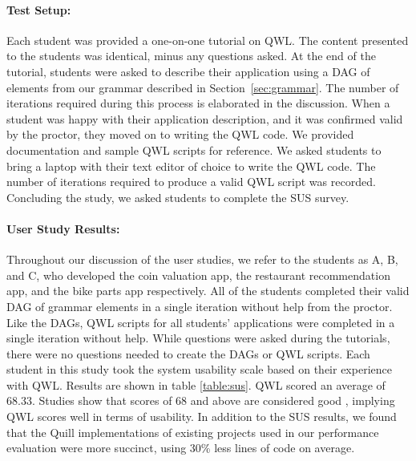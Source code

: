 \documentclass[11pt]{article}
\begin{document}
\paragraph{Test Setup:}
\label{sec:evaluation:usable}
Each student was provided a one-on-one tutorial on QWL.
The content presented to the students was identical, minus any questions asked.
At the end of the tutorial, students were asked to describe their application using a DAG of elements from our grammar described in Section~\ref{sec:grammar}.
The number of iterations required during this process is elaborated in the discussion.
When a student was happy with their application description, and it was confirmed valid by the proctor, they moved on to writing the QWL code.
We provided documentation and sample QWL scripts for reference.
We asked students to bring a laptop with their text editor of choice to write the QWL code.
The number of iterations required to produce a valid QWL script was recorded.
Concluding the study, we asked students to complete the SUS survey.\vspace{0.1cm}

\paragraph{User Study Results:}
Throughout our discussion of the user studies, we refer to the students as A, B, and C, who developed the coin valuation app, the restaurant recommendation app, and the bike parts app respectively.
All of the students completed their valid DAG of grammar elements in a single iteration without help from the proctor.
Like the DAGs, QWL scripts for all students' applications were completed in a single iteration without help.
While questions were asked during the tutorials, there were no questions needed to create the DAGs or QWL scripts. Each student in this study took the system usability scale based on their experience with QWL.
Results are shown in table \ref{table:sus}.
QWL scored an average of 68.33.
Studies show that scores of 68 and above are considered good \cite{brooke1996sus, bangor2008empirical}, implying QWL scores well in terms of usability.
In addition to the SUS results, we found that the Quill implementations of existing projects used in our performance evaluation were more succinct, using 30\% less lines of code on average.
\end{document}
